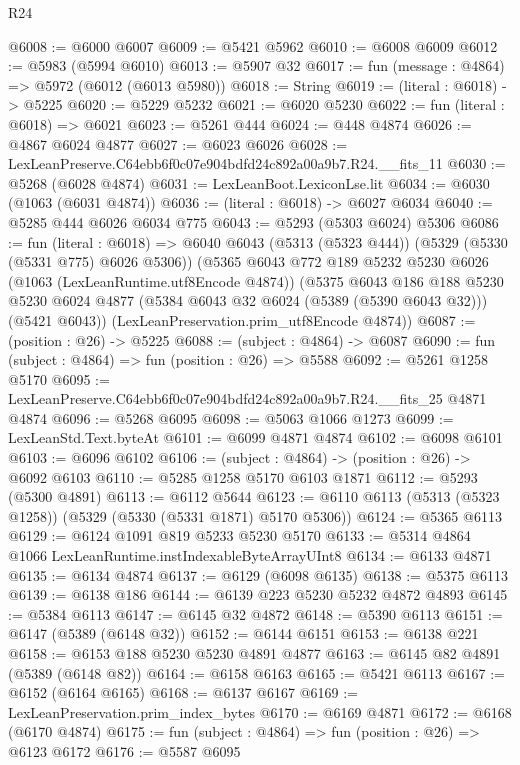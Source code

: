 \begin{lexlean}{R24}
\begin{coremodule}
@6008 := @6000 @6007
@6009 := @5421 @5962
@6010 := @6008 @6009
@6012 := @5983 (@5994 @6010)
@6013 := @5907 @32
@6017 := fun (message : @4864) => @5972 (@6012 (@6013 @5980))
@6018 := String
@6019 := (literal : @6018) -> @5225
@6020 := @5229 @5232
@6021 := @6020 @5230
@6022 := fun (literal : @6018) => @6021
@6023 := @5261 @444
@6024 := @448 @4874
@6026 := @4867 @6024 @4877
@6027 := @6023 @6026
@6028 := LexLeanPreserve.C64ebb6f0c07e904bdfd24c892a00a9b7.R24.__fits_11
@6030 := @5268 (@6028 @4874)
@6031 := LexLeanBoot.LexiconLse.lit
@6034 := @6030 (@1063 (@6031 @4874))
@6036 := (literal : @6018) -> @6027 @6034
@6040 := @5285 @444 @6026 @6034 @775
@6043 := @5293 (@5303 @6024) @5306
@6086 := fun (literal : @6018) =>
  @6040
    @6043
    (@5313 (@5323 @444))
    (@5329 (@5330 (@5331 @775) @6026 @5306))
    (@5365
      @6043
      @772
      @189
      @5232
      @5230
      @6026
      (@1063 (LexLeanRuntime.utf8Encode @4874))
      (@5375
        @6043
        @186
        @188
        @5230
        @5230
        @6024
        @4877
        (@5384 @6043 @32 @6024 (@5389 (@5390 @6043 @32)))
        (@5421 @6043))
      (LexLeanPreservation.prim_utf8Encode @4874))
@6087 := (position : @26) -> @5225
@6088 := (subject : @4864) -> @6087
@6090 := fun (subject : @4864) => fun (position : @26) => @5588
@6092 := @5261 @1258 @5170
@6095 := LexLeanPreserve.C64ebb6f0c07e904bdfd24c892a00a9b7.R24.__fits_25 @4871 @4874
@6096 := @5268 @6095
@6098 := @5063 @1066 @1273
@6099 := LexLeanStd.Text.byteAt
@6101 := @6099 @4871 @4874
@6102 := @6098 @6101
@6103 := @6096 @6102
@6106 := (subject : @4864) -> (position : @26) -> @6092 @6103
@6110 := @5285 @1258 @5170 @6103 @1871
@6112 := @5293 (@5300 @4891)
@6113 := @6112 @5644
@6123 := @6110 @6113 (@5313 (@5323 @1258)) (@5329 (@5330 (@5331 @1871) @5170 @5306))
@6124 := @5365 @6113
@6129 := @6124 @1091 @819 @5233 @5230 @5170
@6133 := @5314 @4864 @1066 LexLeanRuntime.instIndexableByteArrayUInt8
@6134 := @6133 @4871
@6135 := @6134 @4874
@6137 := @6129 (@6098 @6135)
@6138 := @5375 @6113
@6139 := @6138 @186
@6144 := @6139 @223 @5230 @5232 @4872 @4893
@6145 := @5384 @6113
@6147 := @6145 @32 @4872
@6148 := @5390 @6113
@6151 := @6147 (@5389 (@6148 @32))
@6152 := @6144 @6151
@6153 := @6138 @221
@6158 := @6153 @188 @5230 @5230 @4891 @4877
@6163 := @6145 @82 @4891 (@5389 (@6148 @82))
@6164 := @6158 @6163
@6165 := @5421 @6113
@6167 := @6152 (@6164 @6165)
@6168 := @6137 @6167
@6169 := LexLeanPreservation.prim_index_bytes
@6170 := @6169 @4871
@6172 := @6168 (@6170 @4874)
@6175 := fun (subject : @4864) => fun (position : @26) => @6123 @6172
@6176 := @5587 @6095

\end{coremodule}
\end{lexlean}
